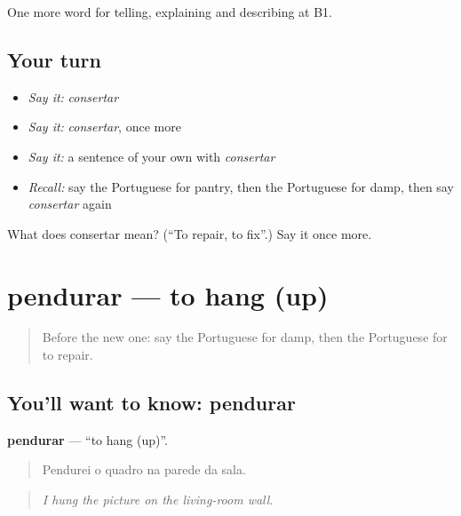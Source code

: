\begin{grammarlens}[title={What you've built}]
One more word for telling, explaining and describing at B1.
\end{grammarlens}

\subsection*{Your turn}
\begin{itemize}
\raggedright
  \item \emph{Say it:} \emph{consertar}
  \item \emph{Say it:} \emph{consertar}, once more
  \item \emph{Say it:} a sentence of your own with \emph{consertar}
  \item \emph{Recall:} say the Portuguese for pantry, then the Portuguese for damp, then say \emph{consertar} again
\end{itemize}

\begin{tcolorbox}[breakable,colback=teal!4,colframe=teal!35!black,title={Before you move on}]
What does consertar mean? (\textquotedblleft{}To repair, to fix\textquotedblright{}.) Say it once more.
\end{tcolorbox}
\section[pendurar]{pendurar — to hang (up)}

\label{lesson:PT-C531-pendurar}



\begin{quote}
Before the new one: say the Portuguese for damp, then the Portuguese for to repair.
\end{quote}

\subsection*{You'll want to know: pendurar}
\textbf{pendurar} — \textquotedblleft{}to hang (up)\textquotedblright{}.

\begin{quote}
Pendurei o quadro na parede da sala.
\end{quote}

\begin{quote}
\emph{I hung the picture on the living-room wall.}
\end{quote}

